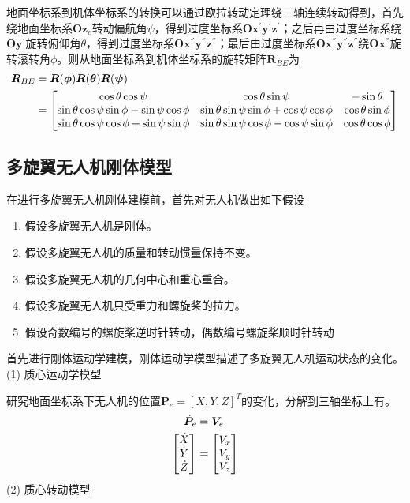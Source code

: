 地面坐标系到机体坐标系的转换可以通过欧拉转动定理绕三轴连续转动得到，首先绕地面坐标系$\boldsymbol{O} \boldsymbol{z}_e$转动偏航角$\psi$，得到过度坐标系$\boldsymbol{O} \boldsymbol{x}^{'} \boldsymbol{y}^{'} \boldsymbol{z}^{'}$；之后再由过度坐标系绕$\boldsymbol{O} \boldsymbol{y}^{'}$旋转俯仰角$\theta$，得到过度坐标系$\boldsymbol{O} \boldsymbol{x}^{''} \boldsymbol{y}^{''} \boldsymbol{z}^{''}$；最后由过度坐标系$\boldsymbol{O} \boldsymbol{x}^{''} \boldsymbol{y}^{''} \boldsymbol{z}^{''}$绕$\boldsymbol{O} \boldsymbol{x}^{''}$旋转滚转角$\phi$。则从地面坐标系到机体坐标系的旋转矩阵$\boldsymbol{R}_{BE}$为
\begin{equation}
\label{equ2.1}
\begin{aligned}
\boldsymbol{R}_{BE} 
&= \boldsymbol{R}(\boldsymbol{\phi}) \boldsymbol{R}(\boldsymbol{\theta}) \boldsymbol{R}(\boldsymbol{\psi}) \\ 
&= 
\begin{bmatrix}
\cos\theta \cos\psi & \cos\theta \sin\psi & -\sin\theta \cr
\sin\theta \cos\psi \sin\phi - \sin\psi \cos\phi & \sin\theta \sin\psi \sin\phi + \cos\psi \cos\phi & \cos\theta \sin\phi \cr
\sin\theta \cos\psi \cos\phi + \sin\psi \sin\phi & \sin\theta \sin\psi \cos\phi - \cos\psi \sin\phi & \cos\theta \cos\phi \cr
\end{bmatrix}
\end{aligned}
\end{equation}

\subsection{多旋翼无人机刚体模型}
在进行多旋翼无人机刚体建模前，首先对无人机做出如下假设\upcite{[2.3]}
\begin{enumerate}  [itemindent=1em,label={(\arabic*)}]
\item 假设多旋翼无人机是刚体。
\item 假设多旋翼无人机的质量和转动惯量保持不变。
\item 假设多旋翼无人机的几何中心和重心重合。
\item 假设多旋翼无人机只受重力和螺旋桨的拉力。
\item 假设奇数编号的螺旋桨逆时针转动，偶数编号螺旋桨顺时针转动
\end{enumerate}
首先进行刚体运动学建模，刚体运动学模型描述了多旋翼无人机运动状态的变化。\\
(1) 质心运动学模型

研究地面坐标系下无人机的位置$\boldsymbol{P}_e = [X,Y,Z]^T$的变化，分解到三轴坐标上有。
\begin{equation}
\label{equ2.2}
\begin{aligned}
\dot{\boldsymbol{P}}_e &= \boldsymbol{V}_e \\
\begin{bmatrix}
\dot{X} \cr \dot{Y} \cr \dot{Z} \cr
\end{bmatrix}
&=
\begin{bmatrix}
V_x \cr V_y \cr V_z \cr
\end{bmatrix}
\end{aligned}
\end{equation}
(2) 质心转动模型

